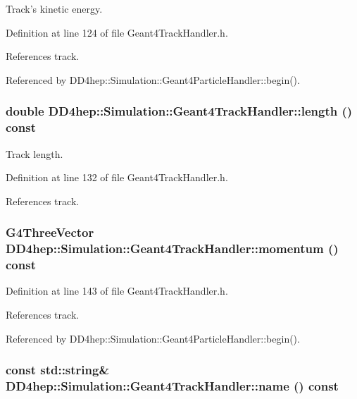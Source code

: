 Track's kinetic energy. 

Definition at line 124 of file Geant4TrackHandler.h.

References track.

Referenced by DD4hep::Simulation::Geant4ParticleHandler::begin().\hypertarget{class_d_d4hep_1_1_simulation_1_1_geant4_track_handler_a90e8a848e17758df7905f8506ee0c19d}{
\subsubsection[{length}]{\setlength{\rightskip}{0pt plus 5cm}double DD4hep::Simulation::Geant4TrackHandler::length () const}}
\label{class_d_d4hep_1_1_simulation_1_1_geant4_track_handler_a90e8a848e17758df7905f8506ee0c19d}


Track length. 

Definition at line 132 of file Geant4TrackHandler.h.

References track.\hypertarget{class_d_d4hep_1_1_simulation_1_1_geant4_track_handler_afa0618147c0860c4b003908cd24d26d9}{
\subsubsection[{momentum}]{\setlength{\rightskip}{0pt plus 5cm}G4ThreeVector DD4hep::Simulation::Geant4TrackHandler::momentum () const}}
\label{class_d_d4hep_1_1_simulation_1_1_geant4_track_handler_afa0618147c0860c4b003908cd24d26d9}


Definition at line 143 of file Geant4TrackHandler.h.

References track.

Referenced by DD4hep::Simulation::Geant4ParticleHandler::begin().\hypertarget{class_d_d4hep_1_1_simulation_1_1_geant4_track_handler_acf7fba0ed0fc7a6074ddb00899b94aae}{
\subsubsection[{name}]{\setlength{\rightskip}{0pt plus 5cm}const std::string\& DD4hep::Simulation::Geant4TrackHandler::name () const}}
\label{class_d_d4hep_1_1_simulation_1_1_geant4_track_handler_acf7fba0ed0fc7a6074ddb00899b94aae}


